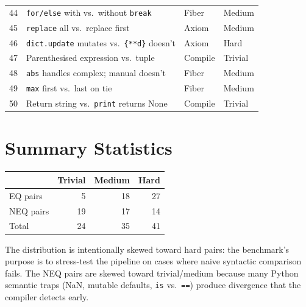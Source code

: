 \documentclass[11pt,a4paper]{report}
\theoremstyle{definition}
\theoremstyle{plain}
\begin{document}
\begin{center}
\begin{tabular}{r p{5cm} l l}
  44 & \texttt{for/else} with vs.\ without \texttt{break} &
       Fiber & Medium \\
  45 & \texttt{replace} all vs.\ replace first &
       Axiom & Medium \\
  46 & \texttt{dict.update} mutates vs.\ \texttt{\{**d\}} doesn't &
       Axiom & Hard \\
  47 & Parenthesised expression vs.\ tuple &
       Compile & Trivial \\
  48 & \texttt{abs} handles complex; manual doesn't &
       Fiber & Medium \\
  49 & \texttt{max} first vs.\ last on tie &
       Fiber & Medium \\
  50 & Return string vs.\ \texttt{print} returns None &
       Compile & Trivial \\
\end{tabular}
\end{center}

\section{Summary Statistics}

\begin{center}
\begin{tabular}{l r r r}
  & \textbf{Trivial} & \textbf{Medium} & \textbf{Hard} \\
  \hline
  EQ pairs  & 5  & 18 & 27 \\
  NEQ pairs & 19 & 17 & 14 \\
  \hline
  Total     & 24 & 35 & 41 \\
\end{tabular}
\end{center}

\noindent
The distribution is intentionally skewed toward hard pairs: the
benchmark's purpose is to stress-test the pipeline on cases where
naive syntactic comparison fails.  The NEQ pairs are skewed toward
trivial/medium because many Python semantic traps (NaN, mutable
defaults, \texttt{is} vs.\ \texttt{==}) produce divergence that
the compiler detects early.







\end{document}
